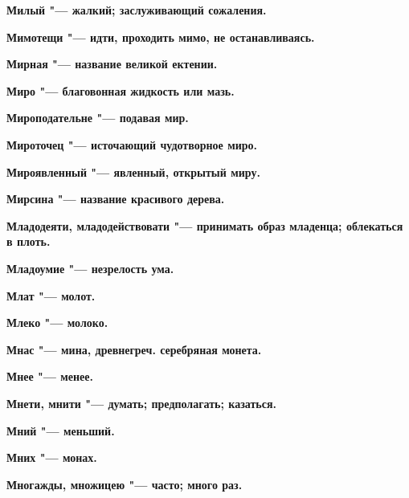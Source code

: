 \begin{multicols}{2}
\bfseries Милый\normalfont{} "--- жалкий; заслуживающий сожаления. 




\bfseries Мимотещи\normalfont{} "--- идти, проходить мимо, не останавливаясь. 




\bfseries Мирная\normalfont{} "--- название великой ектении. 




\bfseries Миро\normalfont{} "--- благовонная жидкость или мазь. 




\bfseries Мироподательне\normalfont{} "--- подавая мир. 




\bfseries Мироточец\normalfont{} "--- источающий чудотворное миро. 




\bfseries Мироявленный\normalfont{} "--- явленный, открытый миру. 




\bfseries Мирсина\normalfont{} "--- название красивого дерева. 




\bfseries Младодеяти, младодействовати\normalfont{} "--- принимать образ младенца; облекаться в плоть. 




\bfseries Младоумие\normalfont{} "--- незрелость ума. 




\bfseries Млат\normalfont{} "--- молот. 




\bfseries Млеко\normalfont{} "--- молоко. 




\bfseries Мнас\normalfont{} "--- мина, древнегреч. серебряная монета. 




\bfseries Мнее\normalfont{} "--- менее. 




\bfseries Мнети, мнити\normalfont{} "--- думать; предполагать; казаться. 




\bfseries Мний\normalfont{} "--- меньший. 




\bfseries Мних\normalfont{} "--- монах. 




\bfseries Многажды, множицею\normalfont{} "--- часто; много раз. 





\end{multicols}
